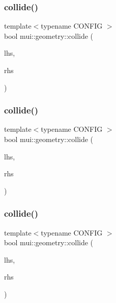 \subsubsection{\texorpdfstring{collide()}{collide()}\hspace{0.1cm}{\footnotesize\ttfamily [1/10]}}
{\footnotesize\ttfamily template$<$typename C\+O\+N\+F\+IG $>$ \\
bool mui\+::geometry\+::collide (\begin{DoxyParamCaption}\item[{const \hyperlink{classmui_1_1geometry_1_1shape}{shape}$<$ C\+O\+N\+F\+IG $>$ \&}]{lhs,  }\item[{const \hyperlink{classmui_1_1geometry_1_1shape}{shape}$<$ C\+O\+N\+F\+IG $>$ \&}]{rhs }\end{DoxyParamCaption})}

\mbox{\label{namespacemui_1_1geometry_a5614121d2669b49f90b25fc76c1b79bb}} 
\subsubsection{\texorpdfstring{collide()}{collide()}\hspace{0.1cm}{\footnotesize\ttfamily [2/10]}}
{\footnotesize\ttfamily template$<$typename C\+O\+N\+F\+IG $>$ \\
bool mui\+::geometry\+::collide (\begin{DoxyParamCaption}\item[{const \hyperlink{classmui_1_1geometry_1_1any__shape}{any\+\_\+shape}$<$ C\+O\+N\+F\+IG $>$ \&}]{lhs,  }\item[{const \hyperlink{classmui_1_1geometry_1_1any__shape}{any\+\_\+shape}$<$ C\+O\+N\+F\+IG $>$ \&}]{rhs }\end{DoxyParamCaption})}

\mbox{\label{namespacemui_1_1geometry_a29f122da511a72d3c5422bbf8268ccc1}} 
\subsubsection{\texorpdfstring{collide()}{collide()}\hspace{0.1cm}{\footnotesize\ttfamily [3/10]}}
{\footnotesize\ttfamily template$<$typename C\+O\+N\+F\+IG $>$ \\
bool mui\+::geometry\+::collide (\begin{DoxyParamCaption}\item[{const \hyperlink{classmui_1_1geometry_1_1any__shape}{any\+\_\+shape}$<$ C\+O\+N\+F\+IG $>$ \&}]{lhs,  }\item[{const \hyperlink{classmui_1_1geometry_1_1shape}{shape}$<$ C\+O\+N\+F\+IG $>$ \&}]{rhs }\end{DoxyParamCaption})}

